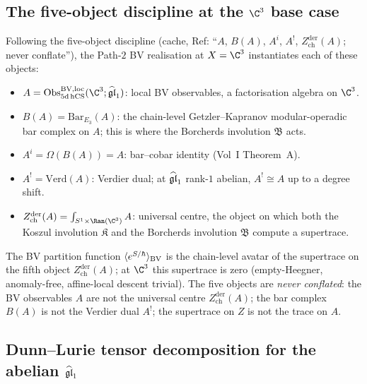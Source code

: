 \subsection*{The five-object discipline at the $\C^3$ base case}

\begin{remark}
\label{rem:bl-bv-c3-five-objects}
Following the five-object discipline (cache, Ref: ``$A$, $B(A)$, $A^i$,
$A^!$, $Z^{\mathrm{der}}_{\mathrm{ch}}(A)$; never conflate''), the
Path-$2$ BV realisation at $X = \C^3$ instantiates each of these
objects:
\begin{itemize}
\item $A = \Obs^{\mathrm{BV}, \mathrm{loc}}_{5\mathrm{d\,hCS}}(\C^3;\ghat)$:
local BV observables, a factorisation algebra on $\C^3$.
\item $B(A) = \mathrm{Bar}_{E_3}(A)$: the chain-level Getzler--Kapranov
modular-operadic bar complex on $A$; this is where the Borcherds
involution $\mathfrak{B}$ acts.
\item $A^i = \Omega(B(A)) = A$: bar--cobar identity (Vol~I Theorem~A).
\item $A^! = \mathrm{Verd}(A)$: Verdier dual; at $\widehat{\mathfrak{gl}}_1$ rank-$1$
abelian, $A^! \cong A$ up to a degree shift.
\item $Z^{\mathrm{der}}_{\mathrm{ch}}(A)
  = \int_{S^1\times\Ran(\C^3)} A$: universal centre, the object on
which both the Koszul involution $\mathfrak{K}$ and the Borcherds
involution $\mathfrak{B}$ compute a supertrace.
\end{itemize}
The BV partition function
$\langle e^{S/\hbar}\rangle_{\mathrm{BV}}$ is the chain-level avatar of the
supertrace on the fifth object $Z^{\mathrm{der}}_{\mathrm{ch}}(A)$;
at $\C^3$ this supertrace is zero (empty-Heegner, anomaly-free,
affine-local descent trivial). The five objects are \emph{never
conflated}: the BV observables $A$ are not the universal centre
$Z^{\mathrm{der}}_{\mathrm{ch}}(A)$; the bar complex $B(A)$ is not
the Verdier dual $A^!$; the supertrace on $Z$ is not the trace on
$A$.
\end{remark}

\subsection*{Dunn--Lurie tensor decomposition for the abelian $\widehat{\mathfrak{gl}}_1$}

